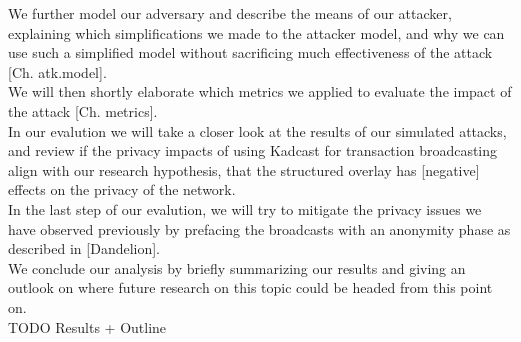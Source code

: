 We further model our adversary and describe the means of our attacker, explaining
which simplifications we made to the attacker model, and why we can use such a simplified model
without sacrificing much effectiveness of the attack [Ch. atk.model]. \\
We will then shortly elaborate which metrics we applied to evaluate the impact of the attack [Ch. metrics]. \\
In our evalution we will take a closer look at the results of our simulated attacks, and
review if the privacy impacts of using Kadcast for transaction broadcasting align with our
research hypothesis, that the structured overlay has [negative] effects on the privacy of the network. \\
In the last step of our evalution, we will try to mitigate the privacy issues we have observed previously
by prefacing the broadcasts with an anonymity phase as described in [Dandelion]. \\
We conclude our analysis by briefly summarizing our results and giving an outlook
on where future research on this topic could be headed from this point on. \\
TODO Results + Outline




